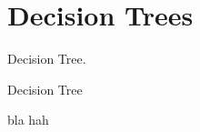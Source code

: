 \section{Decision Trees}
Decision Tree.

\begin{algorithm}
    \caption{Decision Tree}
    \begin{algorithmic}[1]
        \Require bla
        \Ensure hah
    \end{algorithmic}
\end{algorithm}